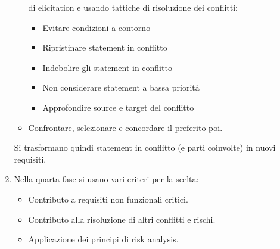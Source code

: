 \begin{enumerate}
\begin{itemize}
                        di elicitation e usando tattiche di risoluzione dei conflitti:
                        \begin{itemize}
                              \item Evitare condizioni a contorno
                              \item Ripristinare statement in conflitto
                              \item Indebolire gli statement in conflitto
                              \item Non considerare statement a bassa priorità
                              \item Approfondire source e target del conflitto
                        \end{itemize}
                  \item Confrontare, selezionare e concordare il preferito poi.
            \end{itemize}
            Si trasformano quindi statement in conflitto (e parti coinvolte) in nuovi requisiti.
      \item Nella quarta fase si usano vari criteri per la scelta:
            \begin{itemize}
                  \item Contributo a requisiti non funzionali critici.
                  \item Contributo alla risoluzione di altri conflitti e rischi.
                  \item Applicazione dei principi di risk analysis.
            \end{itemize}
\end{enumerate}

